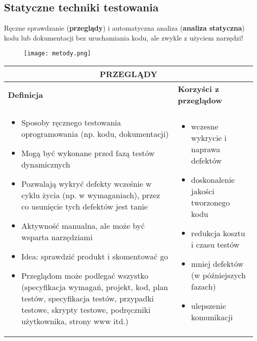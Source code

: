 \documentclass[../main.tex]{subfiles}
\begin{document}
    \subsection{Statyczne techniki testowania}
    Ręczne sprawdzanie (\textbf{przeglądy}) i automatyczna analiza (\textbf{analiza statyczna}) kodu lub dokumentacji
    bez uruchamiania kodu, ale zwykle z użyciem narzędzi!

    \begin{figure}[H]
        \texttt{[image: metody.png]}
    \end{figure}


    \begin{table}[H]
        \begin{center}
            \begin{tabular}{| p{8cm}| p{8cm}|}
                \hline
                \multicolumn{2}{|c|}{ \textbf{PRZEGLĄDY}}\\
                \hline
                \textbf{Definicja} & \textbf{Korzyści z przeglądow}\\
                \hline
                \begin{itemize}
                    \item Sposoby ręcznego testowania oprogramowania (np. kodu, dokumentacji)
                    \item Mogą być wykonane przed fazą testów dynamicznych
                    \item Pozwalają wykryć defekty wcześnie w cyklu życia (np. w wymaganiach),
                    przez co usunięcie tych defektów jest tanie
                    \item Aktywność manualna, ale może być wsparta narzędziami
                    \item Idea: sprawdzić produkt i skomentować go
                    \item Przeglądom może podlegać wszystko (specyfikacja wymagań, projekt,
                    kod, plan testów, specyfikacja testów, przypadki testowe, skrypty testowe,
                    podręczniki użytkownika, strony www itd.)
                \end{itemize}
                &
                \begin{itemize}
                    \item wczesne wykrycie i naprawa defektów
                    \item doskonalenie jakości tworzonego kodu
                    \item redukcja kosztu i czasu testów
                    \item mniej defektów (w późniejszych fazach)
                    \item ulepszenie komunikacji
                \end{itemize}\\
                \hline
            \end{tabular}
        \end{center}
    \end{table}
\end{document}
